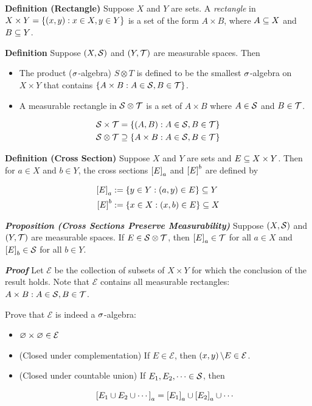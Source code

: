 \documentclass[
]{article}
\begin{document}
\textbf{Definition (Rectangle)} Suppose \(X\) and \(Y\) are sets. A
\emph{rectangle} in \(X\times Y = \brace{\pr{x,y}:x\in X,y\in Y}\) is a
set of the form \(A\times B\), where \(A\se X\) and \(B\se Y\).

\textbf{Definition} Suppose \(\pr{X,\S}\) and \(\pr{Y,\T}\) are
measurable spaces. Then

\begin{itemize}
\item
  The product (\(\s\)-algebra) \(S\otimes T\) is defined to be the
  smallest \(\s\)-algebra on \(X\times Y\) that contains
  \(\brace{A\times B: A\in \S, B\in \T}\).
\item
  A measurable rectangle in \(\S\otimes \T\) is a set of \(A\times B\)
  where \(A\in \S\) and \(B\in \T\).
\end{itemize}

\[\ba
\S\times \T & = \brace{\pr{A,B}:A\in \S, B\in \T}\\
\S\otimes \T & \supseteq \brace{A\times B:A\in \S,B\in \T}
\ea\]

\textbf{Definition (Cross Section)} Suppose \(X\) and \(Y\) are sets and
\(E\se X\times Y\). Then for \(a\in X\) and \(b\in Y\), the cross
sections \(\br{E}_a\) and \(\br{E}^b\) are defined by

\[\ba
\br{E}_a & := \brace{y\in Y:\pr{a,y}\in E}\se Y\\
\br{E}^b & := \brace{x\in X:\pr{x,b}\in E}\se X
\ea\]

\emph{\textbf{Proposition (Cross Sections Preserve Measurability)}}
Suppose \(\pr{X,\S}\) and \(\pr{Y,\T}\) are measurable spaces. If
\(E\in \S\otimes \T\), then \(\br{E}_a \in \T\) for all \(a\in X\) and
\(\br{E}_b\in \S\) for all \(b\in Y\).

\emph{\textbf{Proof}} Let \(\mathcal E\) be the collection of subsets of
\(X\times Y\) for which the conclusion of the result holds. Note that
\(\mathcal E\) contains all measurable rectangles:
\(A\times B: A\in \S,B\in \T\).

Prove that \(\mathcal E\) is indeed a \(\s\)-algebra:

\begin{itemize}
\item
  \(\empty\times \empty\in \mathcal E\)
\item
  (Closed under complementation) If \(E\in \mathcal E\), then
  \(\pr{x,y}\c E\in \mathcal E\).
\item
  (Closed under countable union) If \(E_1,E_2,\cdots\in \S\), then

  \[\br{E_1\cup E_2\cup \cdots }_a = \br{E_1}_a\cup \br{E_2}_a\cup\cdots\]
\end{itemize}
\end{document}
